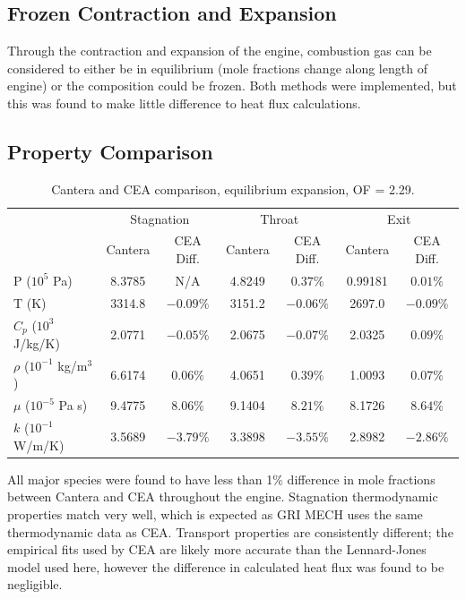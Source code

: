 \documentclass[11pt]{article}
\begin{document}
\subsection{Frozen Contraction and Expansion}

Through the contraction and expansion of the engine, combustion gas can be considered to either be in equilibrium (mole fractions change along length of engine) or the composition could be frozen. Both methods were implemented, but this was found to make little difference to heat flux calculations.


\subsection{Property Comparison}


\begin{table}[H]
  \centering
  \caption{Cantera and CEA comparison, equilibrium expansion, OF = 2.29.}
  \begin{tabular}{l c c c c c c}
    \toprule
    & \multicolumn{2}{c}{Stagnation} & \multicolumn{2}{c}{Throat} & \multicolumn{2}{c}{Exit} \\
    \cmidrule(lr){2-3} \cmidrule(lr){4-5} \cmidrule(lr){6-7}
    & Cantera & CEA Diff. & Cantera & CEA Diff. & Cantera & CEA Diff. \\
    \midrule
    P ($10^5$ Pa) & 8.3785 & N/A & 4.8249 & $0.37\%$ & 0.99181 & $0.01\%$ \\
    T (K) & 3314.8 & $-0.09\%$ & 3151.2 & $-0.06\%$ & 2697.0 & $-0.09\%$ \\
    $C_p$ ($10^3$ J/kg/K) & 2.0771 & $-0.05\%$ & 2.0675 & $-0.07\%$ & 2.0325 & $0.09\%$ \\
    $\rho$ ($10^{-1}$ kg/m$^3$) & 6.6174 & $0.06\%$ & 4.0651 & $0.39\%$ & 1.0093 & $0.07\%$\\
    $\mu$ ($10^{-5}$ Pa s) & 9.4775 & $8.06\%$ & 9.1404 & $8.21\%$ & 8.1726 & $8.64\%$ \\
    $k$ ($10^{-1}$ W/m/K) & 3.5689 & $-3.79\%$ & 3.3898 & $-3.55\%$ & 2.8982 & $-2.86\%$\\
    \bottomrule
  \end{tabular}
\end{table}

All major species were found to have less than 1\% difference in mole fractions between Cantera and CEA throughout the engine. Stagnation thermodynamic properties match very well, which is expected as GRI MECH uses the same thermodynamic data as CEA. Transport properties are consistently different; the empirical fits used by CEA are likely more accurate than the Lennard-Jones model used here, however the difference in calculated heat flux was found to be negligible.
\end{document}
